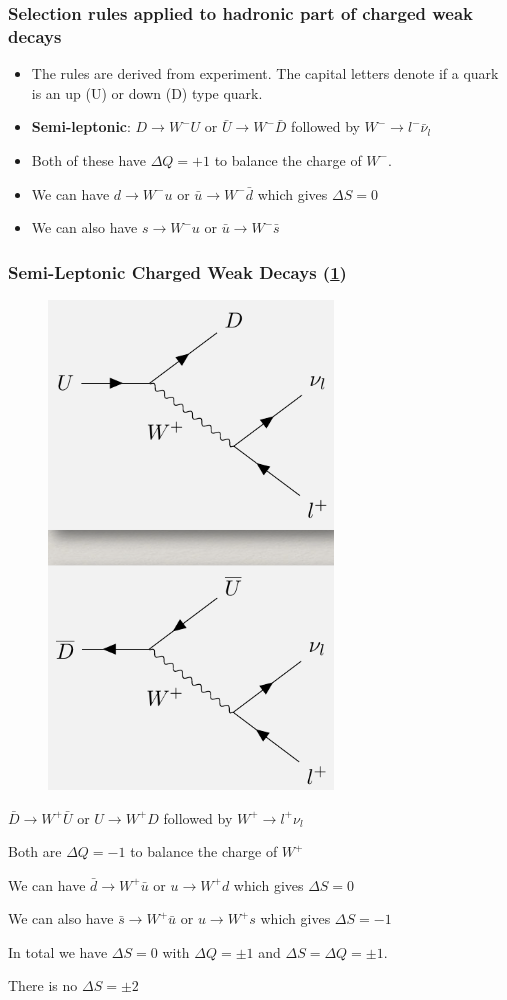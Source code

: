 \subsubsection{Selection rules applied to hadronic part of charged weak decays}
\begin{itemize}
    \item The rules are derived from experiment. The capital letters denote if a quark is an up (U) or down (D) type quark. 
    \item \textbf{Semi-leptonic}: $D → W^{-} U$ or $\bar{U} → W^{-} \bar{D}$ followed by $W^{-} →  l^{-} \bar{ν}_l$
    \item Both of these have $ΔQ = +1$ to balance the charge of $W^{-}$. 
    \item We can have $d → W^{-} u$ or $\bar{u} → W^{-} \bar{d}$ which gives $ΔS = 0$
    \item We can also have $s → W^{-}u$ or $\bar{u} →  W^{-} \bar{s}$
\end{itemize}

\subsubsection{Semi-Leptonic Charged Weak Decays (\cref{fig: semi-leptonic_charged_weak_decays})} 
\begin{itemize}
    \parbox[t]{\dimexpr\textwidth-\leftmargin}{
    \vspace{-7.5mm}
    \begin{figure}
    \vspace{-5mm}
    \centering
    \includegraphics[width = .25\textwidth]{semi-leptonic_charged_weak_decays.png}
    \caption{}
    \label{fig: semi-leptonic_charged_weak_decays}
    \end{figure}
    
    \item $\bar{D} → W^{+} \bar{U}$ or $U → W^{+} D$ followed by $W^{+} → l^{+} ν_l$
    \item Both are $ΔQ = -1$ to balance the charge of $W^{+}$
    \item We can have $\bar{d} → W^{+} \bar{u}$ or $u → W^{+} d$ which gives $ΔS = 0$
    \item We can also have $\bar{s} → W^{+} \bar{u}$ or $u → W^{+} s$ which gives $ΔS = -1$
    \item In total we have $ΔS = 0$ with $ΔQ = ±1$ and $ΔS = ΔQ = ±1$. 
    \item There is no $ΔS = ±2$    
    }
\end{itemize}


